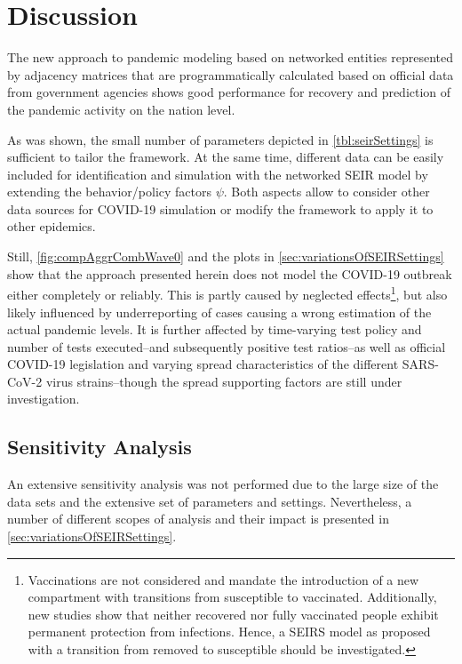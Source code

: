 \section{Discussion}
The new approach to pandemic modeling based on networked entities represented by adjacency matrices that are programmatically calculated based on official data from government agencies shows good performance for recovery and prediction of the pandemic activity on the nation level.

As was shown, the small number of parameters depicted in \autoref{tbl:seirSettings} is sufficient to tailor the framework. At the same time, different data can be easily included for identification and simulation with the networked SEIR model by extending the behavior/policy factors $\psi$. Both aspects allow to consider other data sources for COVID-19 simulation or modify the framework to apply it to other epidemics.

Still, \autoref{fig:compAggrCombWave0} and the plots in \autoref{sec:variationsOfSEIRSettings} show that the approach presented herein does not model the COVID-19 outbreak either completely or reliably. This is partly caused by neglected effects\footnote{Vaccinations are not considered and mandate the introduction of a new compartment with transitions from susceptible to vaccinated. Additionally, new studies show that neither recovered nor fully vaccinated people exhibit permanent protection from infections. Hence, a SEIRS model as proposed \cite{bjornstadSEIRSModelInfectious2020} with a transition from removed to susceptible should be investigated.}, but also likely influenced by underreporting of cases causing a wrong estimation of the actual pandemic levels. It is further affected by time-varying test policy and number of tests executed--and subsequently positive test ratios--as well as official COVID-19 legislation and varying spread characteristics of the different SARS-CoV-2 virus strains--though the spread supporting factors are still under investigation.

\subsection{Sensitivity Analysis}
An extensive sensitivity analysis was not performed due to the large size of the data sets and the extensive set of parameters and settings. Nevertheless, a number of different scopes of analysis and their impact is presented in \autoref{sec:variationsOfSEIRSettings}.